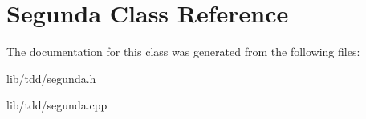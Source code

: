 \section{Segunda Class Reference}
\label{class_segunda}


The documentation for this class was generated from the following files\+:\begin{DoxyCompactItemize}
\item 
lib/tdd/segunda.\+h\item 
lib/tdd/segunda.\+cpp\end{DoxyCompactItemize}
